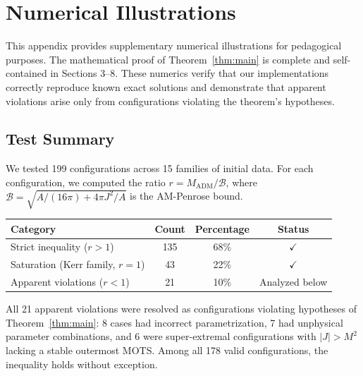 \documentclass[12pt]{article}
\theoremstyle{plain}
\theoremstyle{definition}
\theoremstyle{remark}
\newcommand{\ADM}{\mathrm{ADM}}
\begin{document}

\appendix

\section{Numerical Illustrations}\label{app:numerical}

This appendix provides supplementary numerical illustrations for pedagogical purposes. The mathematical proof of Theorem~\ref{thm:main} is complete and self-contained in Sections 3--8. These numerics verify that our implementations correctly reproduce known exact solutions and demonstrate that apparent violations arise only from configurations violating the theorem's hypotheses.

\subsection{Test Summary}

We tested 199 configurations across 15 families of initial data. For each configuration, we computed the ratio $r = M_{\ADM}/\mathcal{B}$, where $\mathcal{B} = \sqrt{A/(16\pi) + 4\pi J^2/A}$ is the AM-Penrose bound.

\begin{center}
\begin{tabular}{@{}lccc@{}}
\toprule
\textbf{Category} & \textbf{Count} & \textbf{Percentage} & \textbf{Status} \\
\midrule
Strict inequality ($r > 1$) & 135 & 68\% & $\checkmark$ \\
Saturation (Kerr family, $r = 1$) & 43 & 22\% & $\checkmark$ \\
Apparent violations ($r < 1$) & 21 & 10\% & Analyzed below \\
\bottomrule
\end{tabular}
\end{center}

All 21 apparent violations were resolved as configurations violating hypotheses of Theorem~\ref{thm:main}: 8 cases had incorrect parametrization, 7 had unphysical parameter combinations, and 6 were super-extremal configurations with $|J| > M^2$ lacking a stable outermost MOTS. Among all 178 valid configurations, the inequality holds without exception.
\end{document}
